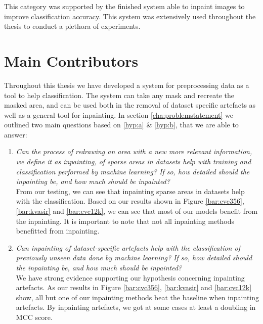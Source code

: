 This category was supported by the finished system able to inpaint images to improve classification accuracy. This system was extensively used throughout the thesis to conduct a plethora of experiments.



\section{Main Contributors}
Throughout this thesis we have developed a system for preprocessing data as a tool to help classification. 
The system can take any mask and recreate the masked area, and can be used both in the removal of dataset specific artefacts as well as a general tool for inpainting. 
In section \ref{cha:problemstatement} we outlined two main questions based on \ref{hyp:a} \& \ref{hyp:b}, that we are able to answer:
\begin{enumerate}


\item \textit{Can the process of redrawing an area with a new more relevant information, we define it as inpainting, of sparse areas in datasets help with training and classification performed by machine learning? If so, how detailed should the inpainting be, and how much should be inpainted?}\\

From our testing, we can see that inpainting sparse areas in datasets help with the classification. Based on our results shown in Figure \ref{bar:cvc356}, \ref{bar:kvasir} and \ref{bar:cvc12k}, we can see that most of our models benefit from the inpainting. It is important to note that not all inpainting methods benefitted from inpainting.



\item \textit{Can inpainting of dataset-specific artefacts help with the classification of previously unseen data done by machine learning? If so, how detailed should the inpainting be, and how much should be inpainted?}\\


We have strong evidence supporting our hypothesis concerning inpainting artefacts. As our results in Figure \ref{bar:cvc356}, \ref{bar:kvasir} and \ref{bar:cvc12k} show, all but one of our inpainting methods beat the baseline when inpainting artefacts. By inpainting artefacts, we got at some cases at least a doubling in MCC score.


\end{enumerate}


